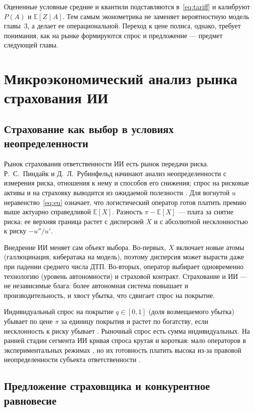 \documentclass[a4paper,14pt]{extarticle}
\begin{document}
Оцененные условные средние и квантили подставляются в~\eqref{eq:tariff} и калибруют $P(A)$ и $\mathbb{E}[Z\mid A]$. Тем самым эконометрика не заменяет вероятностную модель главы~3, а делает ее операциональной. Переход к цене полиса, однако, требует понимания, как на рынке формируются спрос и предложение --- предмет следующей главы.

\section{Микроэкономический анализ рынка страхования ИИ}

\subsection{Страхование как выбор в условиях неопределенности}

Рынок страхования ответственности ИИ есть рынок передачи риска. Р.~С.~Пиндайк и Д.~Л.~Рубинфельд начинают анализ неопределенности с измерения риска, отношения к нему и способов его снижения; спрос на рисковые активы и на страховку выводится из ожидаемой полезности \cite{pindyck}. Для вогнутой $u$ неравенство~\eqref{eq:eu} означает, что логистический оператор готов платить премию выше актуарно справедливой $\mathbb{E}[X]$. Разность $\pi-\mathbb{E}[X]$ --- плата за снятие риска; ее верхняя граница растет с дисперсией $X$ и с абсолютной несклонностью к риску $-u''/u'$.

Внедрение ИИ меняет сам объект выбора. Во-первых, $X$ включает новые атомы (галлюцинация, кибератака на модель), поэтому дисперсия может вырасти даже при падении среднего числа ДТП. Во-вторых, оператор выбирает одновременно технологию (уровень автономности) и страховой контракт. Страхование и ИИ --- не независимые блага: более автономная система повышает и производительность, и хвост убытка, что сдвигает спрос на покрытие.

Индивидуальный спрос на покрытие $q\in[0,1]$ (доля возмещаемого убытка) убывает по цене $\pi$ за единицу покрытия и растет по богатству, если несклонность к риску убывает \cite{pindyck}. Рыночный спрос есть сумма индивидуальных. На ранней стадии сегмента ИИ кривая спроса крутая и короткая: мало операторов в экспериментальных режимах \cite{fz169}, но их готовность платить высока из-за правовой неопределенности субъекта ответственности \cite{zezina}.

\subsection{Предложение страховщика и конкурентное равновесие}
\end{document}
